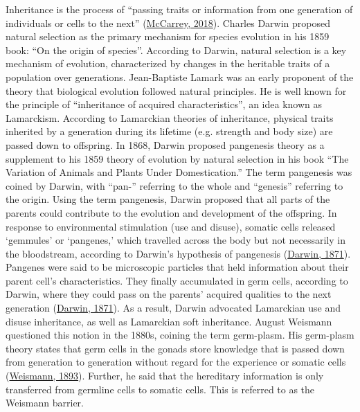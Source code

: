 \documentclass[12pt,twoside]{reedthesis}
\begin{document}
Inheritance is the process of ``passing traits or information from one
generation of individuals or cells to the next'' (\protect\hyperlink{ref-mccarrey2018}{McCarrey, 2018}). Charles
Darwin proposed natural selection as the primary mechanism for species
evolution in his 1859 book: ``On the origin of species''. According to
Darwin, natural selection is a key mechanism of evolution, characterized
by changes in the heritable traits of a population over generations.
Jean-Baptiste Lamark was an early proponent of the theory that
biological evolution followed natural principles. He is well known for
the principle of ``inheritance of acquired characteristics'', an idea
known as Lamarckism. According to Lamarckian theories of inheritance,
physical traits inherited by a generation during its lifetime (e.g.
strength and body size) are passed down to offspring. In 1868, Darwin
proposed pangenesis theory as a supplement to his 1859 theory of
evolution by natural selection in his book ``The Variation of Animals and
Plants Under Domestication.'' The term pangenesis was coined by Darwin,
with ``pan-'' referring to the whole and ``genesis'' referring to the
origin. Using the term pangenesis, Darwin proposed that all parts of the
parents could contribute to the evolution and development of the
offspring. In response to environmental stimulation (use and disuse),
somatic cells released `gemmules' or `pangenes,' which travelled across
the body but not necessarily in the bloodstream, according to Darwin's
hypothesis of pangenesis (\protect\hyperlink{ref-darwin1871}{Darwin, 1871}). Pangenes were said to be
microscopic particles that held information about their parent cell's
characteristics. They finally accumulated in germ cells, according to
Darwin, where they could pass on the parents' acquired qualities to the
next generation (\protect\hyperlink{ref-darwin1871}{Darwin, 1871}). As a result, Darwin advocated Lamarckian
use and disuse inheritance, as well as Lamarckian soft inheritance.
August Weismann questioned this notion in the 1880s, coining the term
germ-plasm. His germ-plasm theory states that germ cells in the gonads
store knowledge that is passed down from generation to generation
without regard for the experience or somatic cells (\protect\hyperlink{ref-weismann1893}{Weismann, 1893}).
Further, he said that the hereditary information is only transferred
from germline cells to somatic cells. This is referred to as the
Weismann barrier.
\end{document}
